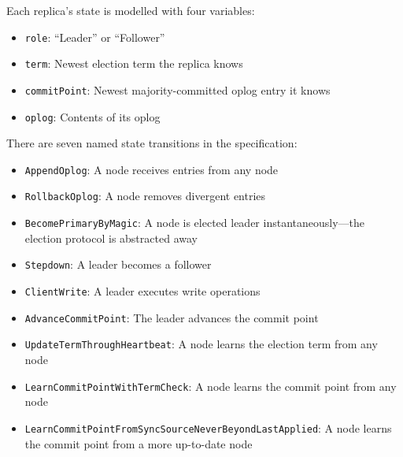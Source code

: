 \documentclass{vldb}
\begin{document}
Each replica's state is modelled with four variables:

\begin{itemize}[itemsep=-0.5ex]
\item \texttt{role}: ``Leader'' or ``Follower''
\item \texttt{term}: Newest election term the replica knows
\item \texttt{commitPoint}: Newest majority-committed oplog entry it knows
\item \texttt{oplog}: Contents of its oplog
\end{itemize}

There are seven named state transitions in the specification:

\begin{itemize}[itemsep=-0.5ex]
\item \texttt{AppendOplog}: A node receives entries from any node
\item \texttt{RollbackOplog}: A node removes divergent entries
\item \texttt{BecomePrimaryByMagic}: A node is elected leader instantaneously---the election protocol is abstracted away
\item \texttt{Stepdown}: A leader becomes a follower
\item \texttt{ClientWrite}: A leader executes write operations
\item \texttt{AdvanceCommitPoint}: The leader advances the commit point
\item \texttt{UpdateTermThroughHeartbeat}: A node learns the election term from any node
\item \texttt{LearnCommitPointWithTermCheck}: A node learns the commit point from any node
\item \texttt{LearnCommitPointFromSyncSource\-Never\-Beyond\-Last\-Applied}: A node learns the commit point from a more up-to-date node
\end{itemize}


\end{document}
